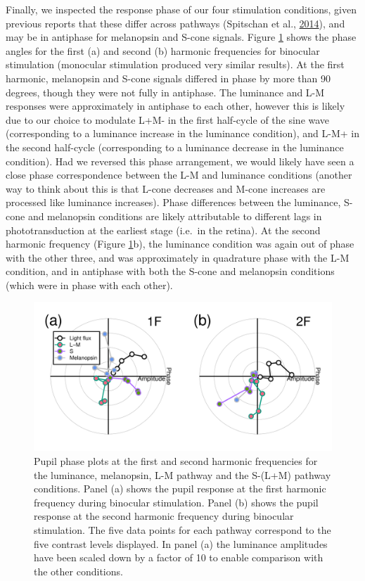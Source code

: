 \documentclass[
]{article}
\begin{document}
Finally, we inspected the response phase of our four stimulation conditions, given previous reports that these differ across pathways (Spitschan et al., \protect\hyperlink{ref-Spitschan2014}{2014}), and may be in antiphase for melanopsin and S-cone signals. Figure \ref{fig:phaseplots} shows the phase angles for the first (a) and second (b) harmonic frequencies for binocular stimulation (monocular stimulation produced very similar results). At the first harmonic, melanopsin and S-cone signals differed in phase by more than 90 degrees, though they were not fully in antiphase. The luminance and L-M responses were approximately in antiphase to each other, however this is likely due to our choice to modulate L+M- in the first half-cycle of the sine wave (corresponding to a luminance increase in the luminance condition), and L-M+ in the second half-cycle (corresponding to a luminance decrease in the luminance condition). Had we reversed this phase arrangement, we would likely have seen a close phase correspondence between the L-M and luminance conditions (another way to think about this is that L-cone decreases and M-cone increases are processed like luminance increases). Phase differences between the luminance, S-cone and melanopsin conditions are likely attributable to different lags in phototransduction at the earliest stage (i.e.~in the retina). At the second harmonic frequency (Figure \ref{fig:phaseplots}b), the luminance condition was again out of phase with the other three, and was approximately in quadrature phase with the L-M condition, and in antiphase with both the S-cone and melanopsin conditions (which were in phase with each other).

\begin{figure}

{\centering \includegraphics{Figures/phaseplots} 

}

\caption{Pupil phase plots at the first and second harmonic frequencies for the luminance, melanopsin, L-M pathway and the S-(L+M) pathway conditions. Panel (a) shows the pupil response at the first harmonic frequency during binocular stimulation. Panel (b) shows the pupil response at the second harmonic frequency during binocular stimulation. The five data points for each pathway correspond to the five contrast levels displayed. In panel (a) the luminance amplitudes have been scaled down by a factor of 10 to enable comparison with the other conditions.}\label{fig:phaseplots}
\end{figure}
\end{document}
